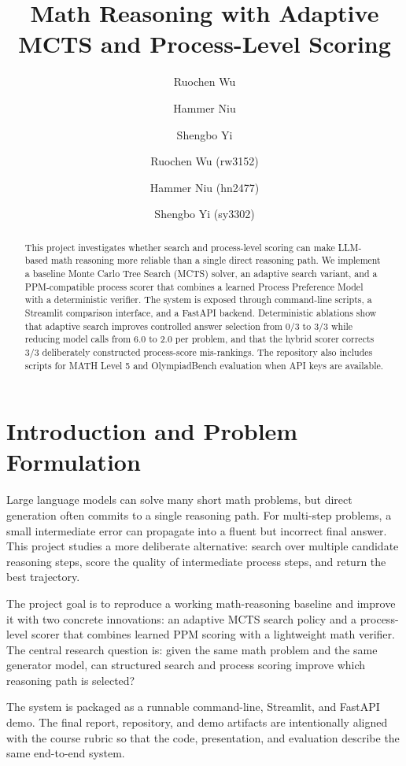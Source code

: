 \documentclass[sigconf,nonacm]{acmart}
\title{Math Reasoning with Adaptive MCTS and Process-Level Scoring}
\author{Ruochen Wu}
\affiliation{\institution{Columbia University}}
\author{Hammer Niu}
\affiliation{\institution{Columbia University}}
\author{Shengbo Yi}
\affiliation{\institution{Columbia University}}
\author{Ruochen Wu (rw3152) \and Hammer Niu (hn2477) \and Shengbo Yi (sy3302)}
\begin{document}
\maketitle

\begin{abstract}
This project investigates whether search and process-level scoring can make
LLM-based math reasoning more reliable than a single direct reasoning path. We
implement a baseline Monte Carlo Tree Search (MCTS) solver, an adaptive search
variant, and a PPM-compatible process scorer that combines a learned Process
Preference Model with a deterministic verifier. The system is exposed through
command-line scripts, a Streamlit comparison interface, and a FastAPI backend.
Deterministic ablations show that adaptive search improves controlled answer
selection from 0/3 to 3/3 while reducing model calls from 6.0 to 2.0 per
problem, and that the hybrid scorer corrects 3/3 deliberately constructed
process-score mis-rankings. The repository also includes scripts for MATH Level
5 and OlympiadBench evaluation when API keys are available.
\end{abstract}

\section{Introduction and Problem Formulation}

Large language models can solve many short math problems, but direct generation
often commits to a single reasoning path. For multi-step problems, a small
intermediate error can propagate into a fluent but incorrect final answer. This
project studies a more deliberate alternative: search over multiple candidate
reasoning steps, score the quality of intermediate process steps, and return the
best trajectory.

The project goal is to reproduce a working math-reasoning baseline and improve
it with two concrete innovations: an adaptive MCTS search policy and a
process-level scorer that combines learned PPM scoring with a lightweight math
verifier. The central research question is: given the same math problem and the
same generator model, can structured search and process scoring improve which
reasoning path is selected?

The system is packaged as a runnable command-line, Streamlit, and FastAPI demo.
The final report, repository, and demo artifacts are intentionally aligned with
the course rubric so that the code, presentation, and evaluation describe the
same end-to-end system.
\end{document}
